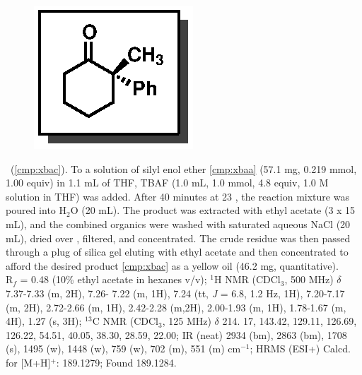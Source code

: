 
\vspace{10pt}
\begin{figure}
  \vspace{-25pt}
  \begin{center}
    \includegraphics[scale=0.8]{chp_singlecarbon/images/xbac}
  \end{center}
  \vspace{-30pt}
\end{figure}\noindent \textbf{\CMPxbac}\ (\ref{cmp:xbac}). To a solution of silyl enol ether
\ref{cmp:xbaa} (57.1 mg, 0.219 mmol, 1.00 equiv) in 1.1 mL of THF, TBAF (1.0 mL, 1.0 mmol, 4.8
equiv, 1.0 M solution in THF) was added. After 40 minutes at 23 \degc, the reaction mixture was
poured into H$_2$O (20 mL). The product was extracted with ethyl acetate (3 x 15 mL), and the
combined organics were washed with saturated aqueous NaCl (20 mL), dried over , filtered,
and concentrated. The crude residue was then passed through a plug of silica gel eluting with ethyl acetate and then
concentrated to afford the desired product \ref{cmp:xbac} as a yellow oil (46.2 mg, quantitative).\\
R$_f$ = 0.48 (10\% ethyl acetate in hexanes v/v); $^1$H NMR (CDCl$_3$, 500 MHz) $\delta$ 7.37-7.33
(m, 2H), 7.26- 7.22 (m, 1H), 7.24 (tt, \textit{J} = 6.8, 1.2 Hz, 1H), 7.20-7.17 (m, 2H), 2.72-2.66 (m,
1H), 2.42-2.28 (m,2H), 2.00-1.93 (m, 1H), 1.78-1.67 (m, 4H), 1.27 (s, 3H); $^{13}$C NMR (CDCl$_3$,
125 MHz) $\delta$ 214. 17, 143.42, 129.11, 126.69, 126.22, 54.51, 40.05, 38.30, 28.59, 22.00; IR
(neat) 2934 (bm), 2863 (bm), 1708 (s), 1495 (w), 1448 (w), 759 (w), 702 (m), 551 (m) cm$^{-1}$; HRMS
(ESI+) Calcd. for  [M+H]$^+$: 189.1279; Found 189.1284.

